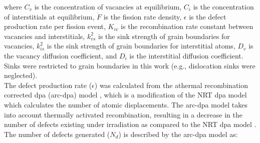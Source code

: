 \documentclass[preprint,12pt]{elsarticle}
\begin{document}
\noindent where $C_{v}$ is the concentration of vacancies at equilibrium, $C_{i}$ is the concentration of interstitials at equilibrium, $\dot{F}$ is the fission rate density, $\epsilon$ is the defect production rate per fission event, $K_{iv}$ is the recombination rate constant between vacancies and interstitials, $k_{vs}^{2}$ is the sink strength of grain boundaries for vacancies, $k_{is}^{2}$ is the sink strength of grain boundaries for interstitial atoms, $D_{v}$ is the vacancy diffusion coefficient, and $D_{i}$ is the interstitial diffusion coefficient. Sinks were restricted to grain boundaries in this work (e.g., dislocation sinks were neglected).\\ 
\indent The defect production rate ($\epsilon$) was calculated from the athermal recombination corrected dpa (arc-dpa) model \cite{nordlund2018improving}, which is a modification of the NRT dpa model \cite{norgett1975proposed} which calculates the number of atomic displacements. The arc-dpa model takes into account thermally activated recombination, resulting in a decrease in the number of defects existing under irradiation as compared to the NRT dpa model \cite{nordlund2018improving}. The number of defects generated ($N_{d}$) is described by the arc-dpa model as:\\
\end{document}
